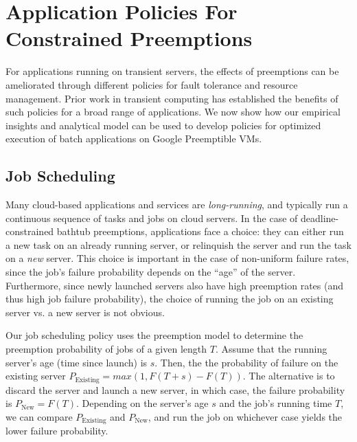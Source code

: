 
\section{Application Policies For Constrained Preemptions}

For applications running on transient servers, the effects of preemptions can be ameliorated through different policies for fault tolerance and resource management.
Prior work in transient computing has established the benefits of such policies for a broad range of applications. 
We now show how our empirical insights and analytical model can be used to develop policies for optimized execution of batch applications on Google Preemptible VMs. 






\subsection{Job Scheduling}

Many cloud-based applications and services are \emph{long-running}, and typically run a continuous sequence of tasks and jobs on cloud servers. 
In the case of deadline-constrained bathtub preemptions, applications face a choice: they can either run a new task on an already running server, or relinquish the server and run the task on a \emph{new} server. 
This choice is important in the case of non-uniform failure rates, since the job's failure probability depends on the ``age'' of the server.
Furthermore, since newly launched servers also have high preemption rates (and thus high job failure probability), the choice of running the job on an existing server vs. a new server is not obvious.


Our job scheduling policy uses the preemption model to determine the preemption probability of jobs of a given length $T$. 
Assume that the running server's age (time since launch) is $s$. 
Then, the the probability of failure on the existing server $P_{\text{Existing}} = max(1, F(T+s) - F(T))$.
The alternative is to discard the server and launch a new server, in which case, the failure probability is $P_{\text{New}} = F(T)$.
Depending on the server's age $s$ and the job's running time $T$, we can compare $P_{\text{Existing}}$ and $P_{\text{New}}$, and run the job on whichever case yields the lower failure probability.

